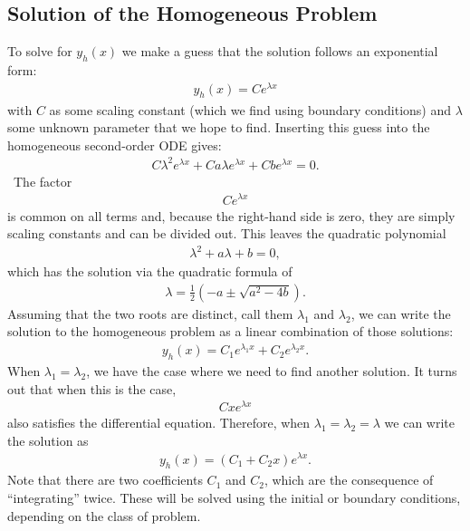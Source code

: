 \subsection{Solution of the Homogeneous Problem}

To solve for $y_h(x)$ we make a guess that the solution follows an exponential form:
\begin{align}
  y_h(x) = C e^{\lambda x}
\end{align}
with $C$ as some scaling constant (which we find using boundary conditions) and $\lambda$ some unknown parameter that we hope to find. Inserting this guess into the homogeneous second-order ODE gives:
\begin{align}
  C \lambda^2 e^{\lambda x} + C a \lambda e^{\lambda x} + C b e^{\lambda x} = 0.
\end{align}\
The factor 
\begin{align}
C e^{\lambda x} \nonumber
\end{align}
is common on all terms and, because the right-hand side is zero, they are simply scaling constants and can be divided out. This leaves the quadratic polynomial
\begin{align}
  \lambda^2 + a \lambda + b = 0,
\end{align}
which has the solution via the quadratic formula of
\begin{align}
  \lambda = \frac{1}{2} \left(  -a \pm \sqrt{ a^2 - 4b } \right).
\end{align}
Assuming that the two roots are distinct, call them $\lambda_1$ and $\lambda_2$, we can write the solution to the homogeneous problem as a linear combination of those solutions:
\begin{align}
  y_h(x) = C_1 e^{\lambda_1 x} + C_2 e^{\lambda_2 x}.
\end{align}
When $\lambda_1 = \lambda_2$, we have the case where we need to find another solution. It turns out that when this is the case,
\begin{align}
C x e^{\lambda x} \nonumber
\end{align}
also satisfies the differential equation. Therefore, when $\lambda_1 = \lambda_2 = \lambda$ we can write the solution as
\begin{align}
  y_h(x) = ( C_1 + C_2 x ) e^{\lambda x}.
\end{align}
Note that there are two coefficients $C_1$ and $C_2$, which are the consequence of ``integrating'' twice. These will be solved using the initial or boundary conditions, depending on the class of problem.

